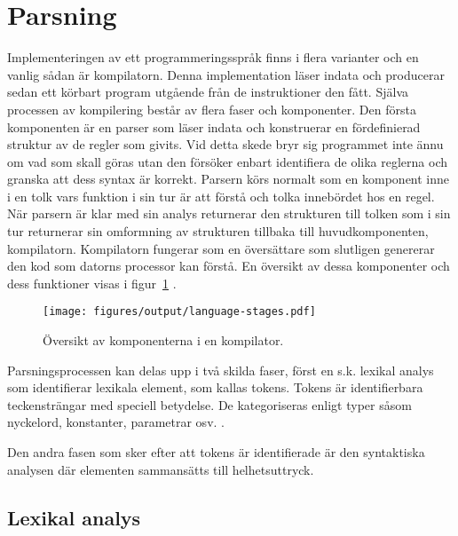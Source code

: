 \section{Parsning}

Implementeringen av ett programmeringsspråk finns i flera varianter och en
vanlig sådan är kompilatorn. Denna implementation läser indata och
producerar sedan ett körbart program utgående från de instruktioner den fått.
Själva processen av kompilering består av flera faser och komponenter. Den
första komponenten är en parser som läser indata och konstruerar en
fördefinierad struktur av de regler som givits. Vid detta skede bryr sig
programmet inte ännu om vad som skall göras utan den försöker enbart identifiera
de olika reglerna och granska att dess syntax är korrekt. Parsern körs normalt
som en komponent inne i en tolk vars funktion i sin tur är att förstå och tolka
innebördet hos en regel. När parsern är klar med sin analys returnerar den
strukturen till tolken som i sin tur returnerar sin omformning av strukturen
tillbaka till huvudkomponenten, kompilatorn. Kompilatorn fungerar som en
översättare som slutligen genererar den kod som datorns processor kan förstå.
En översikt av dessa komponenter och dess funktioner visas i
figur~\ref{fig:compiler} \citep[s. 16]{pt10}.

\begin{figure}[ht]
  \texttt{[image: figures/output/language-stages.pdf]}
  \caption{Översikt av komponenterna i en kompilator.}
  \label{fig:compiler}
\end{figure}

Parsningsprocessen kan delas upp i två skilda faser, först en s.k.
lexikal analys som identifierar lexikala element, som kallas tokens. Tokens
är identifierbara teckensträngar med speciell betydelse. De kategoriseras
enligt typer såsom nyckelord, konstanter, parametrar osv. \citep[s. 6]{aa06}.

Den andra fasen som sker efter att tokens är identifierade är den syntaktiska
analysen där elementen sammansätts till helhetsuttryck.

\subsection{Lexikal analys}

